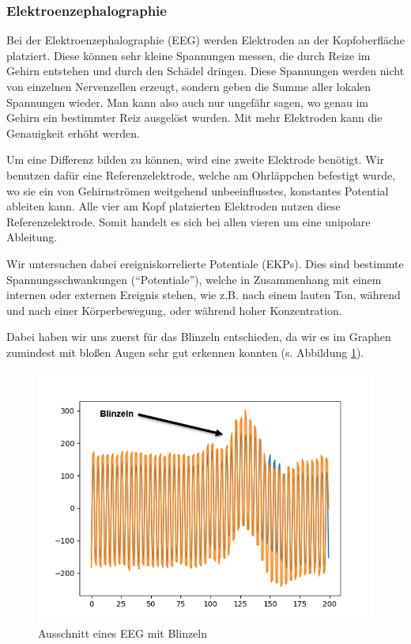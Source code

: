 \documentclass[11pt]{scrartcl}
\begin{document}
	\subsubsection{Elektroenzephalographie}

	Bei der Elektroenzephalographie (EEG) werden Elektroden an der Kopfoberfläche platziert. Diese können sehr kleine Spannungen messen, die durch Reize im Gehirn entstehen und durch den Schädel dringen. Diese Spannungen werden nicht von einzelnen Nervenzellen erzeugt, sondern geben die Summe aller lokalen Spannungen wieder. Man kann also auch nur ungefähr sagen, wo genau im Gehirn ein bestimmter Reiz ausgelöst wurden. Mit mehr Elektroden kann die Genauigkeit erhöht werden. \cite{wiki:EEG} \cite{Birbaumer2010}

	Um eine Differenz bilden zu können, wird eine zweite Elektrode benötigt. Wir benutzen dafür eine Referenzelektrode, welche am Ohrläppchen befestigt wurde, wo sie ein von Gehirnströmen weitgehend unbeeinflusstes, konstantes Potential ableiten kann. Alle vier am Kopf platzierten Elektroden nutzen diese Referenzelektrode. Somit handelt es sich bei allen vieren um eine unipolare Ableitung. \cite{Praktikum}

	Wir untersuchen dabei ereigniskorrelierte Potentiale (EKPs). Dies sind bestimmte Spannungsschwankungen (\enquote{Potentiale}), welche in Zusammenhang mit einem internen oder externen Ereignis stehen, wie z.B. nach einem lauten Ton, während und nach einer Körperbewegung, oder während hoher Konzentration. \cite{Birbaumer2010} \cite{Praktikum}

	Dabei haben wir uns zuerst für das Blinzeln entschieden, da wir es im Graphen zumindest mit bloßen Augen sehr gut erkennen konnten (s. Abbildung \ref{EEG-Blinzeln}).

	\begin{figure}[h]
		\includegraphics{pictures/blinzeln_ekp_beispiel_pyplot_annotated.png}
		\caption{Ausschnitt eines EEG mit Blinzeln}
		\label{EEG-Blinzeln}
	\end{figure}
\end{document}
